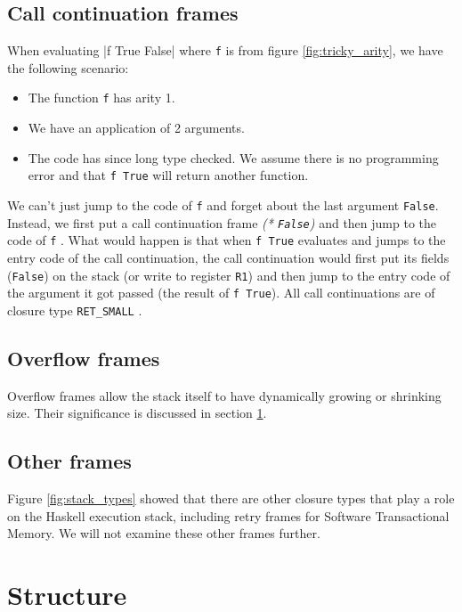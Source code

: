 \subsection{Call continuation frames} \label{sec:call_continuation_frames}

When evaluating |f True False|
where \texttt{f} is from figure \ref{fig:tricky_arity}, we have the
following scenario:

\begin{itemize}
  \item
    The function \texttt{f} has arity 1.
  \item
    We have an application of 2 arguments.
  \item
    The code has since long type checked. We assume there is no
programming error and that \texttt{f True} will return another function.
\end{itemize}

We can't just jump to the code of \texttt{f} and forget about the last
argument \texttt{False}. Instead, we first put a call continuation
frame \emph{(* \texttt{False})} and then jump to the code of \texttt{f}
\cite{evalapplyjfp06}. %
What would happen is that when \texttt{f True} evaluates and jumps to
the entry code of the call continuation, the call continuation would
first put its fields (\texttt{False}) on the stack (or write to
register \texttt{R1}) and then jump to the entry code of the argument it
got passed (the result of \texttt{f True}).
All call continuations are of closure type \texttt{RET\_SMALL}
\cite{github_genapply_RET_SMALL}.

\subsection{Overflow frames}

Overflow frames allow the stack itself to have dynamically growing or
shrinking size. Their significance is discussed in section \ref{sec:structure_of_stack}.

\subsection{Other frames}

Figure \ref{fig:stack_types} showed that there are other closure types
that play a role on the Haskell execution stack, including retry frames
for Software Transactional Memory. We will not examine these other
frames further.

\section{Structure} \label{sec:structure_of_stack}

